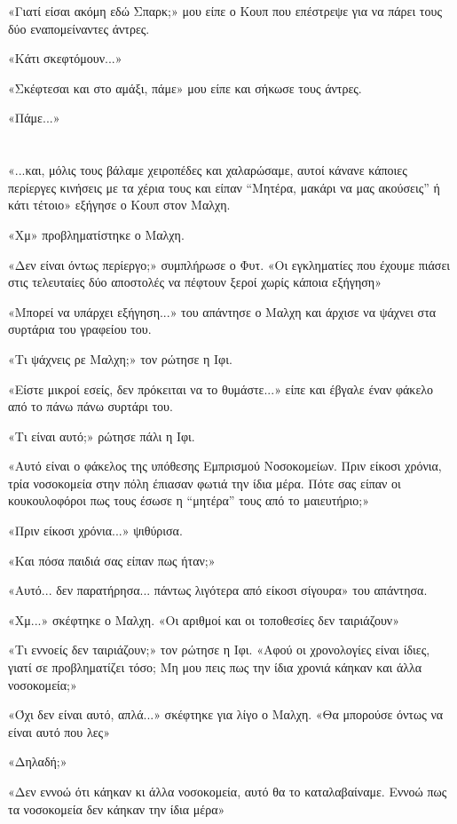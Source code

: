\documentclass[12pt,twoside, openany]{book}
\begin{document}
«Γιατί είσαι ακόμη εδώ Σπαρκ;» μου είπε ο Κουπ που επέστρεψε για να πάρει τους δύο εναπομείναντες άντρες.

«Κάτι σκεφτόμουν...»

«Σκέφτεσαι και στο αμάξι, πάμε» μου είπε και σήκωσε τους άντρες.

«Πάμε...»

\chapter{}

«...και, μόλις τους βάλαμε χειροπέδες και χαλαρώσαμε, αυτοί κάνανε κάποιες περίεργες κινήσεις με τα χέρια τους και είπαν “Μητέρα, μακάρι να μας ακούσεις” ή κάτι τέτοιο» εξήγησε ο Κουπ στον Μαλχη.

«Χμ» προβληματίστηκε ο Μαλχη.

«Δεν είναι όντως περίεργο;» συμπλήρωσε ο Φυτ. «Οι εγκληματίες που έχουμε πιάσει στις τελευταίες δύο αποστολές να πέφτουν ξεροί χωρίς κάποια εξήγηση»

«Μπορεί να υπάρχει εξήγηση...» του απάντησε ο Μαλχη και άρχισε να ψάχνει στα συρτάρια του γραφείου του.

«Τι ψάχνεις ρε Μαλχη;» τον ρώτησε η Ιφι.

«Είστε μικροί εσείς, δεν πρόκειται να το θυμάστε...» είπε και έβγαλε έναν φάκελο από το πάνω πάνω συρτάρι του.

«Τι είναι αυτό;» ρώτησε πάλι η Ιφι.

«Αυτό είναι ο φάκελος της υπόθεσης Εμπρισμού Νοσοκομείων. Πριν είκοσι χρόνια, τρία νοσοκομεία στην πόλη έπιασαν φωτιά την ίδια μέρα. Πότε σας είπαν οι κουκουλοφόροι πως τους έσωσε η “μητέρα” τους από το μαιευτήριο;»

«Πριν είκοσι χρόνια...» ψιθύρισα.

«Και πόσα παιδιά σας είπαν πως ήταν;»

«Αυτό... δεν παρατήρησα... πάντως λιγότερα από είκοσι σίγουρα» του απάντησα.

«Χμ...» σκέφτηκε ο Μαλχη. «Οι αριθμοί και οι τοποθεσίες δεν ταιριάζουν»

«Τι εννοείς δεν ταιριάζουν;» τον ρώτησε η Ιφι. «Αφού οι χρονολογίες είναι ίδιες, γιατί σε προβληματίζει τόσο; Μη μου πεις πως την ίδια χρονιά κάηκαν και άλλα νοσοκομεία;»

«Όχι δεν είναι αυτό, απλά...» σκέφτηκε για λίγο ο Μαλχη. «Θα μπορούσε όντως να είναι αυτό που λες»

«Δηλαδή;»

«Δεν εννοώ ότι κάηκαν κι άλλα νοσοκομεία, αυτό θα το καταλαβαίναμε. Εννοώ πως τα νοσοκομεία δεν κάηκαν την ίδια μέρα»
\end{document}
